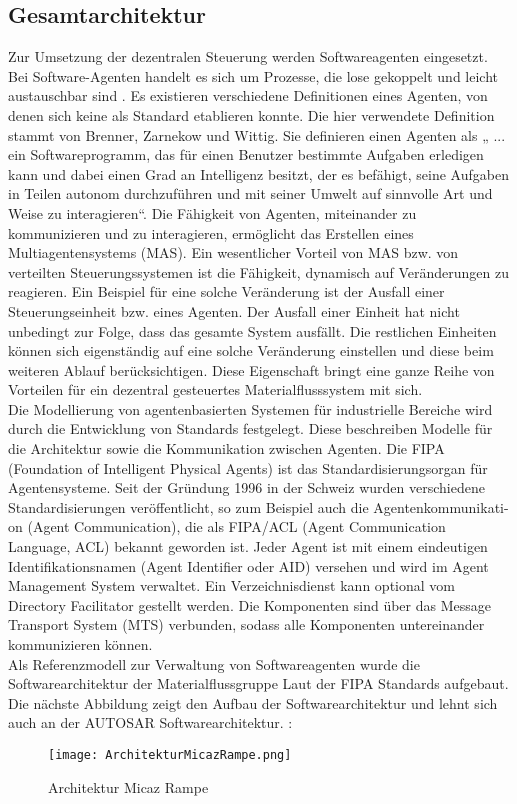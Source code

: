 \subsection{Gesamtarchitektur}
Zur Umsetzung der dezentralen Steuerung werden Softwareagenten eingesetzt. Bei Software-Agenten handelt es sich um Prozesse, die lose gekoppelt 
und leicht austauschbar sind \cite[vgl.][S. 31-37]{GH:2010}. Es existieren verschiedene Definitionen eines Agenten, von denen
sich keine als Standard etablieren konnte. Die hier verwendete Definition stammt von
Brenner, Zarnekow und Wittig. Sie definieren einen Agenten als „ ... ein Softwareprogramm,
das für einen Benutzer bestimmte Aufgaben erledigen kann und dabei einen Grad an
Intelligenz besitzt, der es befähigt, seine Aufgaben in Teilen autonom durchzuführen und mit
seiner Umwelt auf sinnvolle Art und Weise zu interagieren“\cite{BZW:1998}. Die Fähigkeit von Agenten, miteinander zu kommunizieren 
und zu interagieren, ermöglicht das Erstellen eines Multiagentensystems (MAS). Ein wesentlicher Vorteil von MAS 
bzw. von verteilten Steuerungssystemen ist die Fähigkeit, dynamisch auf Veränderungen zu reagieren. Ein Beispiel für eine solche Veränderung ist der
Ausfall einer Steuerungseinheit bzw. eines Agenten. Der Ausfall einer Einheit hat nicht unbedingt zur Folge, dass das gesamte System ausfällt. 
Die restlichen Einheiten können sich eigenständig auf eine solche Veränderung einstellen und diese beim weiteren Ablauf
berücksichtigen\cite[S. 13]{Roidl:2012}. Diese Eigenschaft bringt eine ganze Reihe von Vorteilen für ein dezentral
gesteuertes Materialflusssystem mit sich.\\
Die Modellierung von agentenbasierten Systemen für industrielle Bereiche wird durch die
Entwicklung von Standards festgelegt. Diese beschreiben Modelle für die Architektur
sowie die Kommunikation zwischen Agenten. Die FIPA (Foundation of Intelligent Physical Agents) ist das Standardisierungsorgan
für Agentensysteme.  Seit der Gründung 1996 in der Schweiz wurden verschiedene
Standardisierungen veröffentlicht, so zum Beispiel auch die Agentenkommunikati-
on (Agent Communication), die als FIPA/ACL (Agent Communication Language, ACL) bekannt geworden ist. Jeder Agent ist mit einem eindeutigen
Identifikationsnamen (Agent Identifier oder AID) versehen und wird im Agent Management System verwaltet\cite[S. 24]{Roidl:2012}.
Ein Verzeichnisdienst kann optional vom Directory Facilitator gestellt
werden. Die Komponenten sind über das Message Transport System (MTS) verbunden,
sodass alle Komponenten untereinander kommunizieren können\cite[S. 24]{Roidl:2012}. \\
Als Referenzmodell zur Verwaltung von Softwareagenten wurde die Softwarearchitektur der Materialflussgruppe Laut der  FIPA Standards aufgebaut. 
Die nächste Abbildung zeigt den Aufbau der Softwarearchitektur und lehnt sich auch an der AUTOSAR Softwarearchitektur. :
\begin{figure}[h!]
	\centering
		\texttt{[image: ArchitekturMicazRampe.png]}
	\caption{Architektur Micaz Rampe\cite{Stasch:Hahn}}
	\label{ArchitekturMicazRampe}
\end{figure}
